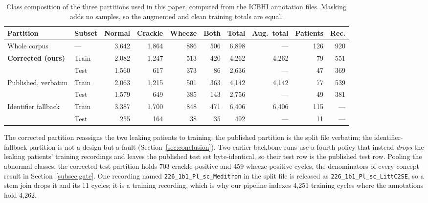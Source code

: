 \documentclass[journal,onecolumn]{IEEEtran}
\newcommand{\best}[1]{\textbf{#1}}
\begin{document}
\begin{table}[hbtp]
\centering
\caption{Class composition of the three partitions used in this paper, computed from the ICBHI
annotation files. Masking adds no samples, so the augmented and clean training totals are equal.}
\label{tab:partitions}
\footnotesize
\begin{tabular}{llrrrrrrrr}
\toprule
Partition & Subset & Normal & Crackle & Wheeze & Both & Total & Aug.\ total & Patients & Rec. \\
\midrule
Whole corpus & --- & 3{,}642 & 1{,}864 & 886 & 506 & 6{,}898 & --- & 126 & 920 \\
\midrule
\multirow{2}{*}{\best{Corrected (ours)}}
 & Train & 2{,}082 & 1{,}247 & 513 & 420 & 4{,}262 & 4{,}262 & 79 & 551 \\
 & Test  & 1{,}560 & \phantom{0,}617 & 373 & \phantom{0}86 & 2{,}636 & --- & 47 & 369 \\
\midrule
\multirow{2}{*}{Published, verbatim}
 & Train & 2{,}063 & 1{,}215 & 501 & 363 & 4{,}142 & 4{,}142 & 77 & 539 \\
 & Test  & 1{,}579 & \phantom{0,}649 & 385 & 143 & 2{,}756 & --- & 49 & 381 \\
\midrule
\multirow{2}{*}{Identifier fallback}
 & Train & 3{,}387 & 1{,}700 & 848 & 471 & 6{,}406 & 6{,}406 & 115 & --- \\
 & Test  & \phantom{0,}255 & \phantom{0,}164 & \phantom{0}38 & \phantom{0}35 & \phantom{2,}492 & --- & \phantom{0}11 & --- \\
\bottomrule
\end{tabular}

\vspace{2pt}
\footnotesize The corrected partition reassigns the two leaking patients to training; the
published partition is the split file verbatim; the identifier-fallback partition is not a
design but a fault (Section~\ref{sec:conclusion}). Two earlier backbone runs use a fourth
policy that instead \emph{drops} the leaking patients' training recordings and leaves the
published test set byte-identical, so their test row is the published test row. Pooling the
abnormal classes, the corrected test partition holds 703 crackle-positive and 459
wheeze-positive cycles, the denominators of every concept result in
Section~\ref{subsec:gate}. One recording named \texttt{226\_1b1\_Pl\_sc\_Meditron} in the
split file is released as \texttt{226\_1b1\_Pl\_sc\_LittC2SE}, so a stem join drops it and its
11 cycles; it is a training recording, which is why our pipeline indexes 4,251 training cycles
where the annotations hold 4,262.
\end{table}
\end{document}
